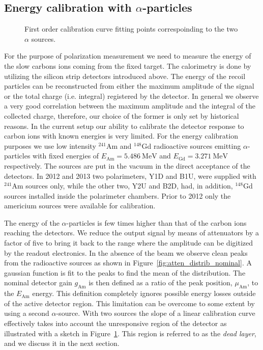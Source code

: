 \documentclass[a4paper,12pt]{article}
\newcommand\americium{${}^{241}$Am}
\newcommand\gadolinium{${}^{148}$Gd}
\newcommand\gainAm{$g_\text{Am}$}
\begin{document}
\subsection{Energy calibration with $\alpha$-particles}

\begin{figure}
\vspace{-\baselineskip} %
\begin{flushright}

\end{flushright}
\caption{First order calibration curve fitting points correspoinding to the two
$\alpha$ sources.}
\label{fig:calib_curve}
\end{figure}

For the purpose of polarization measurement we need to measure the energy of
the slow carbons ions coming from the fixed target. The calorimetry is done by
utilizing the silicon strip detectors introduced above.
The energy of the recoil particles
can be reconstructed from either the maximum amplitude of the signal or the
total charge (i.e. integral) registered by the detector. In general we observe
a very good correlation between the maximum amplitude and the integral of the
collected charge, therefore, our choice of the former is only set by historical
reasons. In the current setup our ability to calibrate the detector response to
carbon ions with known energies is very limited. For the energy calibration
purposes we use low intensity \americium{} and \gadolinium{} radioactive
sources emitting $\alpha$-particles with fixed energies of $E_{\text{Am}} =
5.486~\text{MeV}$ and $E_{\text{Gd}} = 3.271~\text{MeV}$ respectively. The
sources are put in the vacuum in the direct acceptance of the detectors. In
2012 and 2013 two polarimeters, Y1D and B1U, were supplied with \americium{}
sources only, while the other two, Y2U and B2D, had, in addition, \gadolinium{}
sources installed inside the polarimeter chambers. Prior to 2012 only the
americium sources were available for calibration.

The energy of the $\alpha$-particles is few times higher than that of the
carbon ions reaching the detectors. We reduce the output signal by means of
attenuators by a factor of five to bring it back to the range where the
amplitude can be digitized by the readout electronics. In the absence of the
beam we observe clean peaks from the radioactive sources as shown in
Figure~\ref{fig:atten_distrib_nominal}. A gaussian function is fit to the peaks
to find the mean of the distribution. The nominal detector gain \gainAm{} is then
defined as a ratio of the peak position, $\mu_{\text{Am}}$, to the
$E_{\text{Am}}$ energy. This definition completely ignores possible energy
losses outside of the active detector region. This limitation can be overcome
to some extent by using a second $\alpha$-source. With two sources the slope of
a linear calibration curve effectively takes into account the unresponsive
region of the detector as illustrated with a sketch in
Figure~\ref{fig:calib_curve}. This region is referred to as the {\it dead
layer}, and we discuss it in the next section.
\end{document}
